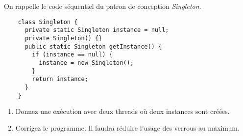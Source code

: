 
\begingroup

\begin{exercice}[Singleton]
  \label{exo:memory/singleton}
  
  On rappelle le code séquentiel du patron de conception \emph{Singleton}.

  \begin{lstlisting}
    class Singleton {
      private static Singleton instance = null;
      private Singleton() {}
      public static Singleton getInstance() {
        if (instance == null) {
          instance = new Singleton();
        }
        return instance;
      }
    }
  \end{lstlisting}
  
  \begin{enumerate}
  \item Donnez une exécution avec deux threads où deux instances sont créées.
  \item Corrigez le programme. Il faudra réduire l'usage des verrous au maximum.
  \end{enumerate}

\end{exercice}

\endgroup
\endinput

